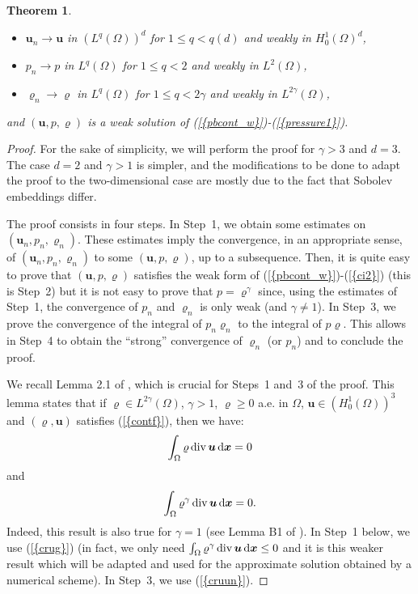 \documentclass{amsart}
\newtheorem{thm}{Theorem}
\numberwithin{equation}{section}
\begin{document}
\begin{thm}
\begin{itemize}
\item ${{\boldsymbol u}}_n {\rightarrow} {{\boldsymbol u}}$ in $(L^q(\Omega))^d$ for $1 \le q < q(d)$ and weakly in $H^1_0(\Omega)^d$,
\item $p_n {\rightarrow} p$ in $L^q(\Omega)$ for $1 \le q < 2$ and weakly in $L^2(\Omega)$,
\item ${\varrho}_n {\rightarrow} {\varrho}$ in $L^q(\Omega)$ for $1 \le q < 2 \gamma$ and weakly in $L^{2\gamma}(\Omega)$,
\end{itemize}
and $({{\boldsymbol u}},p,{\varrho})$ is a weak solution of {(\ref{{pbcont_w}})}-{(\ref{{pressure1}})}.
\label{cwrtd}
\end{thm}

\begin{proof}
For the sake of simplicity, we will perform the proof for  $\gamma >3 $ and $d=3$.
The case $d=2$ and $\gamma >1$ is simpler, and the modifications to be done to adapt the proof to the two-dimensional case are mostly due to the fact that Sobolev embeddings differ.

\medskip
The proof consists in four steps.
In Step~1, we obtain some estimates on $({{\boldsymbol u}}_n,p_n,{\varrho}_n)$.
These estimates imply the convergence, in an appropriate sense, of $({{\boldsymbol u}}_n,p_n,{\varrho}_n)$ to some $({{\boldsymbol u}},p,{\varrho})$, up to a subsequence.
Then, it is quite easy to prove that $({{\boldsymbol u}},p,{\varrho})$ satisfies the weak form of {(\ref{{pbcont_w}})}-{(\ref{{ci2}})} (this is Step~2) but it is not easy to prove that $p={\varrho}^\gamma$ since, using the estimates of Step~1, the convergence of $p_n$ and ${\varrho}_n$ is only weak (and $\gamma \ne 1$).
In Step~3, we prove the convergence of the integral of $p_n {\varrho}_n$ to the integral of $p{\varrho}$.
This allows in Step~4 to obtain the ``strong'' convergence of ${\varrho}_n$ (or $p_n$) and to conclude the proof.

\medskip
We recall Lemma 2.1 of \cite{eymard2010convergent}, which is crucial for Steps~1 and~3 of the proof. 
This lemma states that if ${\varrho} \in L^{2\gamma}(\Omega)$, $\gamma>1$, ${\varrho} \ge 0$ a.e. in $\Omega$, ${{\boldsymbol u}} \in (H^1_0(\Omega))^3$ and $({\varrho}, {{\boldsymbol u}})$ satisfies {(\ref{{contf}})}, then we have:
\begin{equation}
\int_{\Omega} {\varrho} \operatorname{div} {\bm{u}} {\, {\rm d}{{\boldsymbol x}}} =0
\label{cruun}
\end{equation}
and 
\begin{equation}
\int_{\Omega} {\varrho}^{\gamma}  \operatorname{div} {\bm{u}} {\, {\rm d}{{\boldsymbol x}}} =0.
\label{crug}
\end{equation}
Indeed, this result is also true for $\gamma=1$ (see Lemma B1 of \cite{fettah2012numerical}).
In Step~1 below, we use {(\ref{{crug}})} (in fact, we only need $\int_{\Omega} {\varrho}^{\gamma} \operatorname{div} {\bm{u}} {\, {\rm d}{{\boldsymbol x}}} \le 0$ and it is this weaker result
which will be adapted and used for the approximate solution obtained by a numerical scheme).
In Step~3, we use {(\ref{{cruun}})}.
\medskip


\end{proof}
\end{document}
